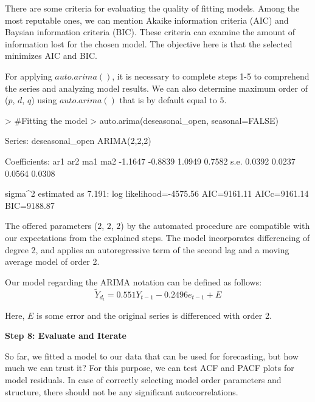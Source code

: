 \documentclass{article}
\begin{document}
There are some criteria for evaluating the quality of fitting models. Among the most reputable ones, we can mention Akaike information criteria (AIC) and Baysian information criteria (BIC). These criteria can examine the amount of information lost for the chosen model. The objective here is that the selected minimizes AIC and BIC.

For applying $auto.arima()$, it is necessary to complete steps 1-5 to comprehend the series and analyzing model results. We can also determine maximum order of ($p$, $d$, $q$) using $auto.arima()$ that  is by default equal to $5$.
\begin{Schunk}
\begin{Sinput}
> #Fitting the model
> auto.arima(deseasonal_open, seasonal=FALSE)
\end{Sinput}
\begin{Soutput}
Series: deseasonal_open 
ARIMA(2,2,2) 

Coefficients:
          ar1      ar2     ma1     ma2
      -1.1647  -0.8839  1.0949  0.7582
s.e.   0.0392   0.0237  0.0564  0.0308

sigma^2 estimated as 7.191:  log likelihood=-4575.56
AIC=9161.11   AICc=9161.14   BIC=9188.87
\end{Soutput}
\end{Schunk}

The offered parameters ($2$, $2$, $2$) by the automated procedure are compatible with our expectations from the explained steps. The model incorporates differencing of degree 2, and applies an autoregressive term of the second lag and a moving average model of order 2.

Our model regarding the ARIMA notation can be defined as follows:
\begin{equation}
\tilde{Y}_{d_t}=0.551Y_{t-1}-0.2496e_{t-1}+E
\end{equation}

Here, $E$ is some error and the original series is differenced with order 2.

\textbf{Step 8: Evaluate and Iterate}

So far, we fitted a model to our data that can be used for forecasting, but how much we can trust it? For this purpose, we can test ACF and PACF plots for model residuals.  In case of correctly selecting model order parameters and structure, there should not be any significant autocorrelations.
\end{document}
